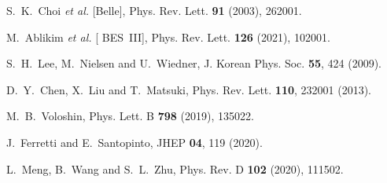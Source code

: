 \documentclass[preprint,12pt,3p]{elsarticle}
\begin{document}
\begin{thebibliography}{99}
 
S.~K.~Choi \textit{et al.} [Belle],
Phys. Rev. Lett. \textbf{91} (2003), 262001.

M.~Ablikim \textit{et al.} [ BES~III],
Phys. Rev. Lett. \textbf{126} (2021), 102001.


S.~H.~Lee, M.~Nielsen and U.~Wiedner,
J. Korean Phys. Soc. \textbf{55}, 424 (2009).

D.~Y.~Chen, X.~Liu and T.~Matsuki,
Phys. Rev. Lett. \textbf{110}, 232001 (2013).

M.~B.~Voloshin,
Phys. Lett. B \textbf{798} (2019), 135022.


J.~Ferretti and E.~Santopinto,
JHEP \textbf{04}, 119 (2020).

L.~Meng, B.~Wang and S.~L.~Zhu,
Phys. Rev. D \textbf{102} (2020), 111502.


\end{thebibliography}
\end{document}
